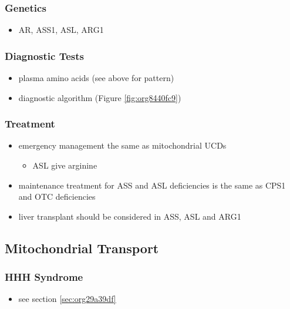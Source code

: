 \documentclass{scrartcl}
\begin{document}
\subsubsection{Genetics}
\label{sec:org5806434}
\begin{itemize}
\item AR, ASS1, ASL, ARG1
\end{itemize}

\subsubsection{Diagnostic Tests}
\label{sec:org6f8a3a0}
\begin{itemize}
\item plasma amino acids (see above for pattern)
\item diagnostic algorithm (Figure \ref{fig:org8440fc9})
\end{itemize}

\subsubsection{Treatment}
\label{sec:org18a85cd}
\begin{itemize}
\item emergency management the same as mitochondrial UCDs
\begin{itemize}
\item ASL give arginine
\end{itemize}
\item maintenance treatment for ASS and ASL deficiencies is the same as
CPS1 and OTC deficiencies
\item liver transplant should be considered in ASS, ASL and ARG1
\end{itemize}

\subsection{Mitochondrial Transport}
\label{sec:orgacc24f8}
\subsubsection{HHH Syndrome}
\label{sec:org1717cdb}
\begin{itemize}
\item see section \ref{sec:org29a39df}
\end{itemize}
\end{document}
